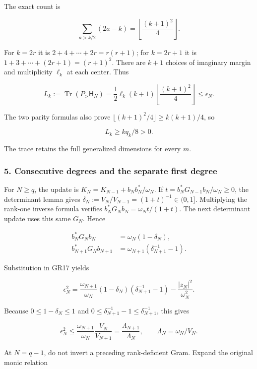 The exact count is

\[
\sum_{a>k/2}(2a-k)=\left\lfloor\frac{(k+1)^2}{4}\right\rfloor.
\tag{GR19}
\]

For \(k=2r\) it is \(2+4+\cdots+2r=r(r+1)\); for \(k=2r+1\) it is \(1+3+\cdots+(2r+1)=(r+1)^2\). There are \(k+1\) choices of imaginary margin and multiplicity \(\ell_k\) at each center. Thus

\[
L_k:=\operatorname{Tr}(P_>\mathsf H_N)
=\frac12\ell_k(k+1)\left\lfloor\frac{(k+1)^2}{4}\right\rfloor
\le\epsilon_N.
\tag{GR20}
\]

The two parity formulas also prove \(\lfloor(k+1)^2/4\rfloor\ge k(k+1)/4\), so

\[
L_k\ge kq_k/8>0.
\tag{GR21}
\]

The trace retains the full generalized dimensions for every \(m\).

\subsubsection{5. Consecutive degrees and the separate first degree}\label{GraphV2:endpoint-gamma_review--consecutive-degrees-and-the-separate-first-degree}

For \(N\ge q\), the update is \(K_N=K_{N-1}+b_Nb_N^*/\omega_N\). If \(t=b_N^*G_{N-1}b_N/\omega_N\ge0\), the determinant lemma gives \(\delta_N:=V_N/V_{N-1}=(1+t)^{-1}\in(0,1]\). Multiplying the rank-one inverse formula verifies \(b_N^*G_Nb_N=\omega_Nt/(1+t)\). The next determinant update uses this same \(G_N\). Hence

\[
\begin{aligned}
b_N^*G_Nb_N&=\omega_N(1-\delta_N),\\
b_{N+1}^*G_Nb_{N+1}&=\omega_{N+1}(\delta_{N+1}^{-1}-1).
\end{aligned}
\tag{GR22}
\]

Substitution in GR17 yields

\[
\epsilon_N^2=
\frac{\omega_{N+1}}{\omega_N}(1-\delta_N)(\delta_{N+1}^{-1}-1)
-\frac{|z_N|^2}{\omega_N^2}.
\tag{GR23}
\]

Because \(0\le1-\delta_N\le1\) and \(0\le\delta_{N+1}^{-1}-1\le\delta_{N+1}^{-1}\), this gives

\[
\epsilon_N^2\le
\frac{\omega_{N+1}}{\omega_N}\frac{V_N}{V_{N+1}}
=\frac{\Lambda_{N+1}}{\Lambda_N},
\qquad \Lambda_N=\omega_N/V_N.
\tag{GR24}
\]

At \(N=q-1\), do not invert a preceding rank-deficient Gram. Expand the original monic relation

